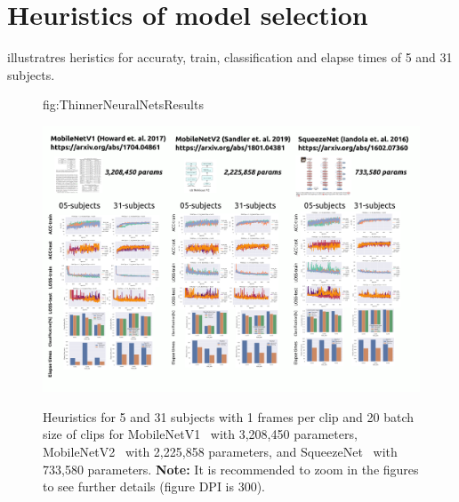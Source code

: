 \documentclass[mlabstract,twocolumn]{jmlr}
\begin{document}
\begin{figure}[htbp]
\end{figure}

\section{Heuristics of model selection} \label{apd:heuristics}
 illustratres heristics for accuraty, train, classification and elapse times of 5 and 31 subjects.
\begin{figure}[ht]
\floatconts
  {fig:ThinnerNeuralNetsResults}
  {\caption{
    Heuristics for 5 and 31 subjects with 1 frames per clip and 20 batch size of clips for
    MobileNetV1~\citep{2017-howared_CoRR_MobileNetV1} with 3,208,450 parameters, MobileNetV2~\citep{Sandler_2018_CVPR_MobileNetV2} with 2,225,858 parameters, and SqueezeNet~\citep{iandola2017squeezenet} with 733,580 parameters.
    \textbf{Note:} It is recommended to zoom in the figures to see further details (figure DPI is 300).
          }
  }
  {\includegraphics[width=\textwidth]{../figures/comparing-NETS-for-USviewclassification/versions/drawing-v02}}%
\end{figure}
\end{document}
